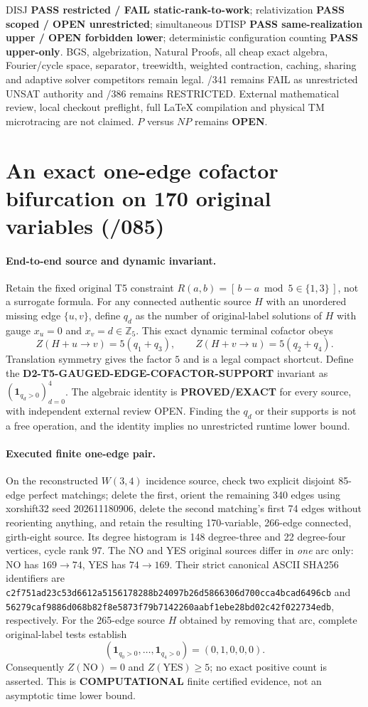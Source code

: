 \documentclass[11pt]{article}
\begin{document}
DISJ \textbf{PASS restricted / FAIL static-rank-to-work};
relativization \textbf{PASS scoped / OPEN unrestricted};
simultaneous DTISP \textbf{PASS same-realization upper /
OPEN forbidden lower}; deterministic configuration counting
\textbf{PASS upper-only}. BGS, algebrization, Natural Proofs,
all cheap exact algebra, Fourier/cycle space, separator,
treewidth, weighted contraction, caching, sharing and
adaptive solver competitors remain legal. /341 remains
FAIL as unrestricted UNSAT authority and /386 remains
RESTRICTED. External mathematical review, local checkout
preflight, full \LaTeX{} compilation and physical TM
microtracing are not claimed. $P$ versus $NP$ remains
\textbf{OPEN}.

\section{An exact one-edge cofactor bifurcation on 170 original variables (/085)}
\paragraph{End-to-end source and dynamic invariant.}
Retain the fixed original T5 constraint $R(a,b)=[\,b-a\bmod 5\in\{1,3\}\,]$,
not a surrogate formula. For any connected authentic source $H$ with
an unordered missing edge $\{u,v\}$, define $q_d$ as the number of
original-label solutions of $H$ with gauge $x_u=0$ and
$x_v=d\in\mathbb Z_5$. This exact dynamic terminal cofactor
obeys
\[
Z(H+u\to v)=5(q_1+q_3),\qquad
Z(H+v\to u)=5(q_2+q_4).
\]
Translation symmetry gives the factor $5$ and is a legal compact
shortcut. Define the
\textbf{D2-T5-GAUGED-EDGE-COFACTOR-SUPPORT} invariant as
$(\mathbf1_{q_d>0})_{d=0}^4$.
The algebraic identity is \textbf{PROVED/EXACT} for every source,
with independent external review OPEN. Finding the $q_d$ or their
supports is not a free operation, and the identity implies no
unrestricted runtime lower bound.

\paragraph{Executed finite one-edge pair.}
On the reconstructed $W(3,4)$ incidence source, check two explicit
disjoint 85-edge perfect matchings; delete the first, orient the
remaining 340 edges using xorshift32 seed 202611180906, delete the
second matching's first 74 edges without reorienting anything, and
retain the resulting 170-variable, 266-edge connected, girth-eight
source. Its degree histogram is 148 degree-three and 22
degree-four vertices, cycle rank 97. The NO and YES original
sources differ in \emph{one} arc only:
NO has $169\to74$, YES has $74\to169$. Their strict canonical
ASCII SHA256 identifiers are
\texttt{c2f751ad23c53d6612a5156178288b24097b26d5866306d700cca4bcad6496cb}
and
\texttt{56279caf9886d068b82f8e5873f79b7142260aabf1ebe28bd02c42f022734edb},
respectively. For the 265-edge source $H$ obtained by removing
that arc, complete original-label tests establish
\[
(\mathbf1_{q_0>0},\ldots,\mathbf1_{q_4>0})
=\boxed{(0,1,0,0,0)}.
\]
Consequently $Z(\mathrm{NO})=0$ and
$Z(\mathrm{YES})\ge5$; no exact positive count is asserted.
This is \textbf{COMPUTATIONAL} finite certified evidence, not an
asymptotic time lower bound.
\end{document}
